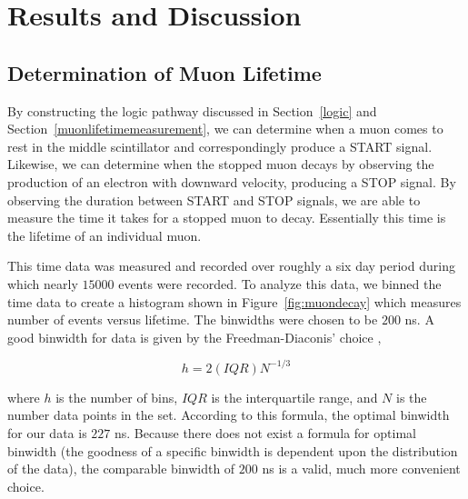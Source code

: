 
\section{Results and Discussion}\label{resultsanddiscussion}

\subsection{Determination of Muon Lifetime}\label{determinationofmuonlifetime}

By constructing the logic pathway discussed in Section~\ref{logic} and Section~\ref{muonlifetimemeasurement},
we can determine when a muon comes to rest in the middle scintillator
and correspondingly produce a START signal. Likewise, we can determine when the stopped muon decays by observing
the production of an electron with downward velocity, producing a STOP signal.  By observing the
duration between START and STOP signals, we are able to measure
the time it takes for a stopped muon to decay.  Essentially this time
is the lifetime of an individual muon.

This time data was measured and recorded over roughly a six day period
during which nearly $15000$ events were recorded.  To analyze this
data, we binned the time data to create a histogram shown in Figure~\ref{fig:muondecay} which measures number of events versus lifetime.
The binwidths were chosen to be $200$ ns. A good binwidth for data is given by the Freedman-Diaconis' choice \cite{scott},

\begin{equation}
\label{eq:binwidth}
h=2(IQR)N^{-1/3}
\end{equation}

where $h$ is the number of bins, $IQR$ is the interquartile range, and $N$ is the number data points in the set.  According to this formula, the optimal binwidth for our data is $227$ ns.  Because there does not exist a formula for optimal binwidth (the goodness of a specific binwidth is dependent upon the distribution of the data), the comparable binwidth of $200$ ns is a valid, much more convenient choice. 



